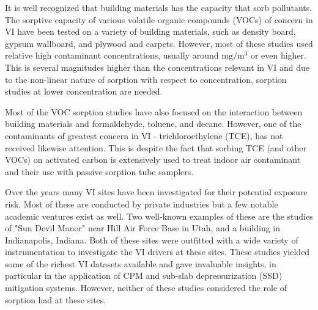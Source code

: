 It is well recognized that building materials has the capacity that sorb pollutants.
The sorptive capacity of various volatile organic compounds (VOCs) of concern in VI have been tested on a variety of building materials, such as density board\cite{wang_correlation_2008}, gypsum wallboard\cite{xu_determination_2012}, and plywood and carpets\cite{bodalal_method_2000}.
However, most of these studies used relative high contaminant concentrations, usually around $\mathrm{mg/m^3}$\cite{wang_correlation_2008} or even higher.
This is several magnitudes higher than the concentrations relevant in VI and due to the non-linear nature of sorption with respect to concentration, sorption studies at lower concentration are needed.\par

Most of the VOC sorption studies have also focused on the interaction between building materials and formaldehyde\cite{xu_determination_2012}, toluene, and decane\cite{bodalal_method_2000}.
However, one of the contaminants of greatest concern in VI - trichloroethylene (TCE), has not received likewise attention.
This is despite the fact that sorbing TCE (and other VOCs) on activated carbon is extensively used to treat indoor air contaminant and their use with passive sorption tube samplers\cite{u.s._environmental_protection_agency_oswer_2015}.\par


Over the years many VI sites have been investigated for their potential exposure risk.
Most of these are conducted by private industries but a few notable academic ventures exist as well.
Two well-known examples of these are the studies of "Sun Devil Manor" near Hill Air Force Base in Utah, and a building in Indianapolis, Indiana.
Both of these sites were outfitted with a wide variety of instrumentation to investigate the VI drivers at these sites.
These studies yielded some of the richest VI datasets available and gave invaluable insights, in particular in the application of CPM\cite{holton_long-term_2015} and sub-slab depressurization (SSD) mitigation systems\cite{lutes_comparing_2015,u.s._environmental_protection_agency_assessment_2015}.
However, neither of these studies considered the role of sorption had at these sites.\par

